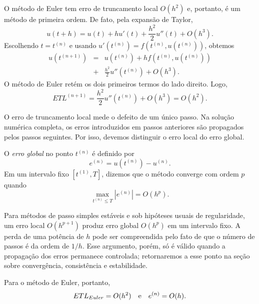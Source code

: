 \begin{ex}
O método de Euler tem erro de truncamento local $O(h^2)$ e, portanto, é um método de primeira ordem. De fato, pela expansão de Taylor,
\begin{equation}
u(t+h)=u(t)+hu'(t)+\frac{h^2}{2}u''(t)+O(h^3).
\end{equation}
Escolhendo $t=t^{(n)}$ e usando $u'(t^{(n)})=f(t^{(n)},u(t^{(n)}))$, obtemos
\begin{eqnarray}
u(t^{(n+1)})&=&u(t^{(n)})+hf(t^{(n)},u(t^{(n)}))\nonumber\\
&+&\frac{h^2}{2}u''(t^{(n)})+O(h^3).
\end{eqnarray}
O método de Euler retém os dois primeiros termos do lado direito. Logo,
\begin{equation}
ETL^{(n+1)}=\frac{h^2}{2}u''(t^{(n)})+O(h^3)=O(h^2).
\end{equation}
\end{ex}

O erro de truncamento local mede o defeito de um único passo. Na solução numérica completa, os erros introduzidos em passos anteriores são propagados pelos passos seguintes. Por isso, devemos distinguir o erro local do erro global.

\begin{defn}
O \emph{erro global} no ponto $t^{(n)}$ é definido por
\begin{equation}
e^{(n)}=u(t^{(n)})-u^{(n)}.
\end{equation}
Em um intervalo fixo $[t^{(1)},T]$, dizemos que o método converge com ordem $p$ quando
\begin{equation}
\max_{t^{(n)}\leq T}|e^{(n)}|=O(h^p).
\end{equation}
\end{defn}

Para métodos de passo simples estáveis e sob hipóteses usuais de regularidade, um erro local $O(h^{p+1})$ produz erro global $O(h^p)$ em um intervalo fixo. A perda de uma potência de $h$ pode ser compreendida pelo fato de que o número de passos é da ordem de $1/h$. Esse argumento, porém, só é válido quando a propagação dos erros permanece controlada; retornaremos a esse ponto na seção sobre convergência, consistência e estabilidade.

Para o método de Euler, portanto,
\begin{equation}
ETL_{Euler}=O(h^2)~~~\hbox{e}~~~e^{(n)}=O(h).
\end{equation}

